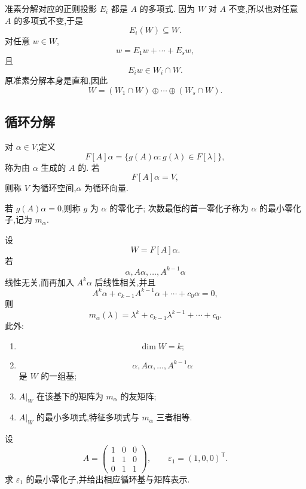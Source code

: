 \begin{solution}
准素分解对应的正则投影 $E_i$ 都是 $A$ 的多项式.
因为 $W$ 对 $A$ 不变,所以也对任意 $A$ 的多项式不变,于是
\[
E_i(W)\subseteq W.
\]
对任意 $w\in W$,
\[
w=E_1w+\cdots+E_sw,
\]
且
\[
E_iw\in W_i\cap W.
\]
原准素分解本身是直和,因此
\[
\boxed{
W=(W_1\cap W)\oplus\cdots\oplus(W_s\cap W).
}
\]
\end{solution}


\subsection{循环分解}

\begin{definition}
对 $\alpha\in V$,定义
\[
F[A]\alpha
=
\{g(A)\alpha:g(\lambda)\in F[\lambda]\},
\]
称为由 $\alpha$ 生成的 $A$ 的.
若
\[
F[A]\alpha=V,
\]
则称 $V$ 为循环空间,$\alpha$ 为循环向量.

若 $g(A)\alpha=0$,则称 $g$ 为 $\alpha$ 的零化子;
次数最低的首一零化子称为 $\alpha$ 的最小零化子,记为 $m_\alpha$.
\end{definition}

\begin{theorem}[\markstar]
设
\[
W=F[A]\alpha.
\]
若
\[
\alpha,A\alpha,\ldots,A^{k-1}\alpha
\]
线性无关,而再加入 $A^k\alpha$ 后线性相关,并且
\[
A^k\alpha+c_{k-1}A^{k-1}\alpha+\cdots+c_0\alpha=0,
\]
则
\[
m_\alpha(\lambda)
=
\lambda^k+c_{k-1}\lambda^{k-1}+\cdots+c_0.
\]
此外:
\begin{enumerate}
    \item
    \[
    \dim W=k;
    \]
    \item
    \[
    \alpha,A\alpha,\ldots,A^{k-1}\alpha
    \]
    是 $W$ 的一组基;
    \item $A|_W$ 在该基下的矩阵为 $m_\alpha$ 的友矩阵;
    \item $A|_W$ 的最小多项式,特征多项式与 $m_\alpha$ 三者相等.
\end{enumerate}
\end{theorem}


\begin{example}
设
\[
A=
\begin{pmatrix}
1&0&0\\
1&1&0\\
0&1&1
\end{pmatrix},
\qquad
\varepsilon_1=(1,0,0)^{\mathsf T}.
\]
求 $\varepsilon_1$ 的最小零化子,并给出相应循环基与矩阵表示.
\end{example}
\exampleblank

